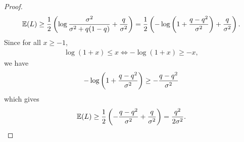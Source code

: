 \documentclass{article}
\theoremstyle{plain}
\theoremstyle{definition}
\theoremstyle{remark}
\begin{document}
\begin{proof}
\begin{align}
        \operatorname{\mathbb{E}}(L)
            \geq \frac{1}{2} \left( \log \frac{\sigma^2}{\sigma^2 + q(1-q)} + \frac{q}{\sigma^2}\right)
            = \frac{1}{2} \left( -\log \left( 1 + \frac{q-q^2}{\sigma^2} \right) + \frac{q}{\sigma^2}\right).
            \label{eq:plrv_mean_lower}
    \end{align}
    Since for all $x \geq -1$,
    \begin{align}
        \log (1+x) \leq x \Leftrightarrow - \log(1+x) \geq -x,
    \end{align}
    we have
    \begin{align}
        -\log \left( 1 + \frac{q-q^2}{\sigma^2} \right) \geq -\frac{q-q^2}{\sigma^2}
    \end{align}
    which gives
    \begin{align}
        \operatorname{\mathbb{E}}(L)
            \geq \frac{1}{2} \left( -\frac{q-q^2}{\sigma^2} + \frac{q}{\sigma^2}\right)
            = \frac{q^2}{2\sigma^2}.
    \end{align}
\end{proof}
\end{document}
